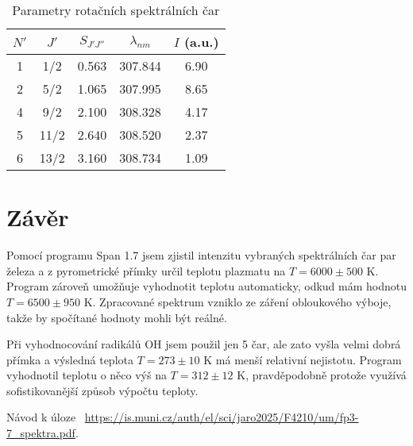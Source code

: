 \documentclass[a4paper,11pt]{article}
\begin{document}
\begin{table}[htpb]
    \vspace{-30pt}
    \centering
    \begin{tabular}{c c c c c}
        $ N' $  & $ J' $  & $ S_{J'J''} $ & $ \lambda_{nm} $ & $ I $  (a.u.)   \\\hline
        1 & 1/2 & 0.563 & 307.844 & 6.90 \\
        2 & 5/2 & 1.065 & 307.995 & 8.65 \\
        4 & 9/2 & 2.100 & 308.328 & 4.17 \\
        5 & 11/2 & 2.640 & 308.520 & 2.37 \\
        6 & 13/2 & 3.160 & 308.734 & 1.09 \\
    \end{tabular}
    \caption{Parametry rotačních spektrálních čar}
\end{table}

\newpage

\section{Závěr}

Pomocí programu Span 1.7 jsem zjistil intenzitu vybraných spektrálních čar par železa a z pyrometrické přímky určil teplotu plazmatu na $ T = 6000 \pm 500 $ K. Program zároveň umožňuje vyhodnotit teplotu automaticky, odkud mám hodnotu $ T = 6500 \pm 950 $ K. Zpracované spektrum vzniklo ze záření obloukového výboje, takže by spočítané hodnoty mohli být reálné. 

Při vyhodnocování radikálů OH jsem použil jen 5 čar, ale zato vyšla velmi dobrá přímka a výsledná teplota $ T = 273 \pm 10 $ K má menší relativní nejistotu. Program vyhodnotil teplotu o něco výš na $ T = 312 \pm 12 $ K, pravděpodobně protože využívá sofistikovanější způsob výpočtu teploty. 

\begin{thebibliography}{0}
 Návod k úloze ~\url{https://is.muni.cz/auth/el/sci/jaro2025/F4210/um/fp3-7_spektra.pdf}.   
\end{thebibliography}
\end{document}
